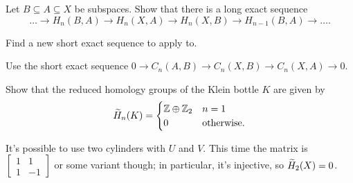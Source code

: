 \begin{sproblem}
	\label{prob:triple_long_exact}
	Let $B \subseteq A \subseteq X$ be subspaces.
	Show that there is a long exact sequence
	\[
		\dots \to H_n(B,A) \to H_n(X,A)
		\to H_n(X,B) \to H_{n-1}(B,A) \to \dots.
	\]
	\begin{hint}
		Find a new short exact sequence
		to apply  to.
	\end{hint}
	\begin{sol}
		Use the short exact sequence
		$0 \to C_n(A,B) \to C_n(X,B) \to C_n(X,A) \to 0$.
	\end{sol}
\end{sproblem}

\begin{sproblem}
	\gim
	Show that the reduced homology groups of the Klein bottle $K$ are given by
	\[
		\widetilde H_n(K) = 
		\begin{cases}
			\mathbb Z \oplus \mathbb Z_{2} & n = 1 \\
			0 & \text{otherwise}.
		\end{cases}
	\]
	\begin{hint}
		It's possible to use two cylinders with $U$ and $V$.
		This time the matrix is $\begin{bmatrix} 1 & 1 \\ 1 & -1 \end{bmatrix}$
		or some variant though; in particular, it's injective, so $\widetilde H_2(X) = 0$.
	\end{hint}
\end{sproblem}
